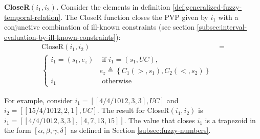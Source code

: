 \begin{definition}
\label{def:close-r-a-pvp}
\textbf{CloseR$\left(i_1, i_2\right)$.}
Consider the elements in definition \ref{def:generalized-fuzzy-temporal-relation}. The CloseR function closes the PVP given by $i_1$ with a conjunctive combination of ill-known constraints (see section \ref{subsec:interval-evaluation-by-ill-known-constraints}):
\begin{align}
\label{eq:close-r-a-pvp}
\text{CloseR}\left(i_1, i_2\right) &= \\
\begin{cases}
\nonumber
i_1 = \left(s_1, e_z \right) & \mbox{ if } i_1 = (s_1, UC), \\
& e_z \triangleq \left \lbrace C_1\left(>, s_1 \right), C_2\left(<, s_2 \right) \right \rbrace \\
i_1 & \mbox{ otherwise }
\end{cases}
\end{align}
\end{definition}

For example, consider $i_1 = \left[\left[4/4/1012, 3, 3\right] , UC\right]$ and $i_2 = \left[ \left[15/4/1012,2,1\right], UC\right]$. The result for CloseR$\left(i_1, i_2\right)$  is $i_1 = \left[ \left[4/4/1012, 3, 3\right], \left[4,7,13,15 \right] \right]$. The value that closes $i_1$ is a trapezoid in the form $\left[ \alpha, \beta, \gamma, \delta \right]$ as defined in Section \ref{subsec:fuzzy-numbers}.

